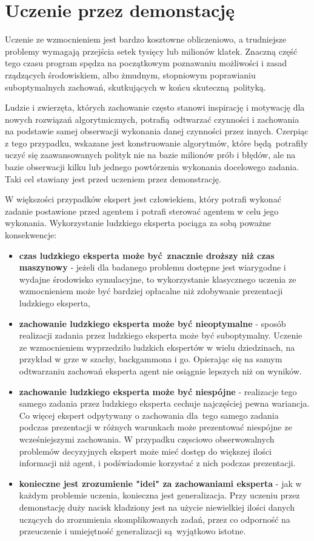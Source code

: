 \section{Uczenie przez demonstację}\label{imitation_learning}
Uczenie ze wzmocnieniem jest bardzo kosztowne obliczeniowo, a trudniejsze problemy wymagają przejścia setek tysięcy lub milionów klatek. Znaczną część tego czasu program spędza na początkowym poznawaniu możliwości i zasad rządzących środowiskiem, albo żmudnym, stopniowym poprawianiu suboptymalnych zachowań, skutkujących w końcu skuteczną polityką.

Ludzie i zwierzęta, których zachowanie często stanowi inspirację i motywację dla nowych rozwiązań algorytmicznych, potrafią odtwarzać czynności i zachowania na podstawie samej obserwacji wykonania danej czynności przez innych. Czerpiąc z tego przypadku, wskazane jest konstruowanie algorytmów, które będą potrafiły uczyć się zaawansowanych polityk nie na bazie milionów prób i błędów, ale na bazie obserwacji kilku lub jednego powtórzenia wykonania docelowego zadania. Taki cel stawiany jest przed uczeniem przez demonstrację.

W większości przypadków ekspert jest człowiekiem, który potrafi wykonać zadanie postawione przed agentem i potrafi sterować agentem w celu jego wykonania. Wykorzystanie ludzkiego eksperta pociąga za sobą poważne konsekwencje:
\begin{itemize}
\item \textbf{czas ludzkiego eksperta może być znacznie droższy niż czas maszynowy} - jeżeli dla badanego problemu dostępne jest wiarygodne i wydajne środowisko symulacyjne, to wykorzystanie klasycznego uczenia ze wzmocnieniem może być bardziej opłacalne niż zdobywanie prezentacji ludzkiego eksperta,
\item \textbf{zachowanie ludzkiego eksperta może być nieoptymalne} - sposób realizacji zadania przez ludzkiego eksperta może być suboptymalny. Uczenie ze wzmocnieniem wyprzedziło ludzkich ekspertów w wielu dziedzinach, na przykład w grze w szachy, backgammona i go. Opierając się na samym odtwarzaniu zachowań eksperta agent nie osiągnie lepszych niż on wyników.
\item \textbf{zachowanie ludzkiego eksperta może być niespójne} - realizacje tego samego zadania przez ludzkiego eksperta cechuje najczęściej pewna wariancja. Co więcej ekspert odpytywany o zachowania dla tego samego zadania podczas prezentacji w różnych warunkach może prezentować niespójne ze wcześniejszymi zachowania. W przypadku częsciowo obserwowalnych problemów decyzyjnych ekspert może mieć dostęp do większej ilości informacji niż agent, i podświadomie korzystać z nich podczas prezentacji.
\item  \textbf{konieczne jest zrozumienie "idei" za zachowaniami eksperta} - jak w każdym problemie uczenia, konieczna jest generalizacja. Przy uczeniu przez demonstację duży nacisk kładziony jest na użycie niewielkiej ilości danych uczących do zrozumienia skomplikowanych zadań, przez co odporność na przeuczenie i umiejętność generalizacji są wyjątkowo istotne.
\end{itemize}   


